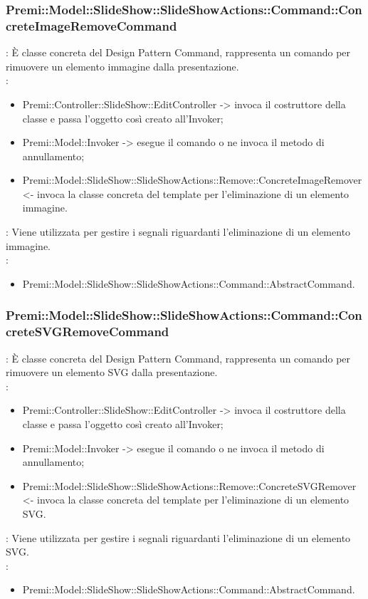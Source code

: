 {                    \subsubsection{Premi::Model::SlideShow::SlideShowActions::Command::ConcreteImageRemoveCommand}{
				\textbf{\tipo}: È classe concreta del Design Pattern Command, rappresenta un comando per rimuovere un elemento immagine dalla presentazione.\\	
				\textbf{\relaz}: 
				\begin{itemize}
					\item Premi::Controller::SlideShow::EditController -> invoca il costruttore della classe e passa l’oggetto così creato all’Invoker;
                    \item Premi::Model::Invoker -> esegue il comando o ne invoca il metodo di annullamento;
                    \item Premi::Model::SlideShow::SlideShowActions::Remove::ConcreteImageRemover <- invoca la classe concreta del  template per l’eliminazione di un elemento immagine.
				\end{itemize}	
                \textbf{\interfacce}: Viene utilizzata per gestire i segnali riguardanti l’eliminazione di un elemento immagine.\\
                \textbf{\base}: 
                    \begin{itemize}
                    \item Premi::Model::SlideShow::SlideShowActions::Command::AbstractCommand.
                    \end{itemize}
                    }               
                    \subsubsection{Premi::Model::SlideShow::SlideShowActions::Command::ConcreteSVGRemoveCommand}{
				\textbf{\tipo}: È classe concreta del Design Pattern Command, rappresenta un comando per rimuovere un elemento SVG dalla presentazione.\\	
				\textbf{\relaz}: 
				\begin{itemize}
					\item Premi::Controller::SlideShow::EditController -> invoca il costruttore della classe e passa l’oggetto così creato all’Invoker;
                    \item Premi::Model::Invoker -> esegue il comando o ne invoca il metodo di annullamento;
                    \item Premi::Model::SlideShow::SlideShowActions::Remove::ConcreteSVGRemover <- invoca la classe concreta del  template per l’eliminazione di un elemento SVG.
				\end{itemize}	
                \textbf{\interfacce}: Viene utilizzata per gestire i segnali riguardanti l’eliminazione di un elemento SVG.\\
                \textbf{\base}: 
                    \begin{itemize}
                    \item Premi::Model::SlideShow::SlideShowActions::Command::AbstractCommand.
                    \end{itemize}
                    }
}
